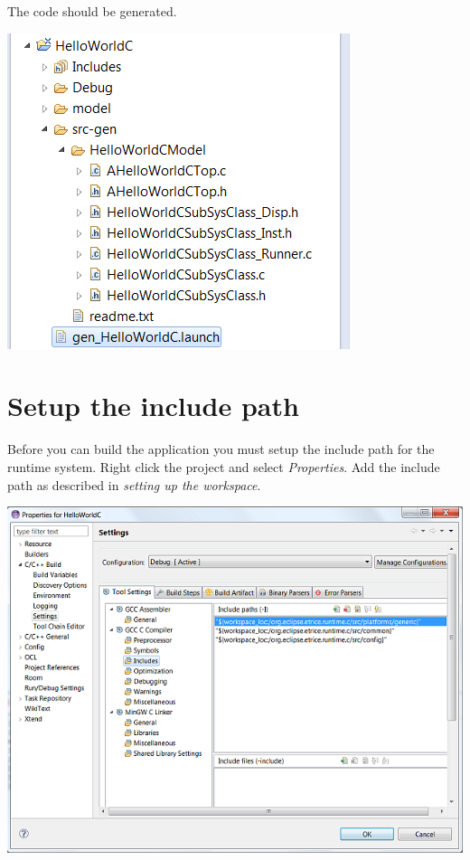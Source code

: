 The code should be generated.

\includegraphics{images/034-HelloWorldC13.png}

\section{Setup the include path}

Before you can build the application you must setup the include path for the runtime system. Right click 
the project and select \textit{Properties}. Add the include path as described in \textit{setting up the 
workspace}.

\includegraphics{images/034-HelloWorldC14.png}

